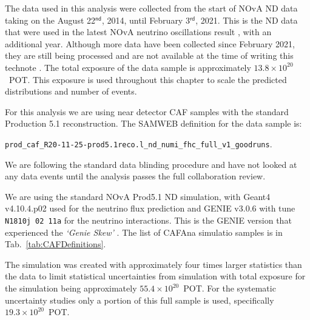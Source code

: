 The data used in this analysis were collected from the start of \gls{NOvA} \gls{ND} data taking on the August 22$^{\textsf{nd}}$, 2014, until February 3$^{\textsf{rd}}$, 2021. This is the \gls{ND} data that were used in the latest \gls{NOvA} neutrino oscillations result \cite{NOvAResults2021.pdf}, with an additional year. Although more data have been collected since February 2021, they are still being processed and are not available at the time of writing this technote . The total exposure of the data sample is approximately $13.8\times10^{20}$~\gls{POT}. This exposure is used throughout this chapter to scale the predicted distributions and number of events.

For this analysis we are using near detector CAF samples with the standard Production 5.1 reconstruction. The SAMWEB definition for the data sample is:
\begin{center}
\texttt{prod\_caf\_R20-11-25-prod5.1reco.l\_nd\_numi\_fhc\_full\_v1\_goodruns}.
\end{center}
We are following the standard data blinding procedure and have not looked at any data events until the analysis passes the full collaboration review.

We are using the standard \gls{NOvA} Prod5.1 \gls{ND} simulation, with Geant4 v4.10.4.p02 \cite{Geant4} used for the neutrino flux prediction and GENIE v3.0.6 \cite{GENIE} with tune \texttt{N1810j 02 11a} for the neutrino interactions. This is the GENIE version that experienced the \textit{`Genie Skew'} . The list of CAFAna simulatio samples is in Tab.~\ref{tab:CAFDefinitions}.

The simulation was created with approximately four times larger statistics than the data to limit statistical uncertainties from simulation with total exposure for the simulation being approximately $55.4\times10^{20}$~\gls{POT}. For the systematic uncertainty studies only a portion of this full sample is used, specifically $19.3\times10^{20}$~\gls{POT}.

